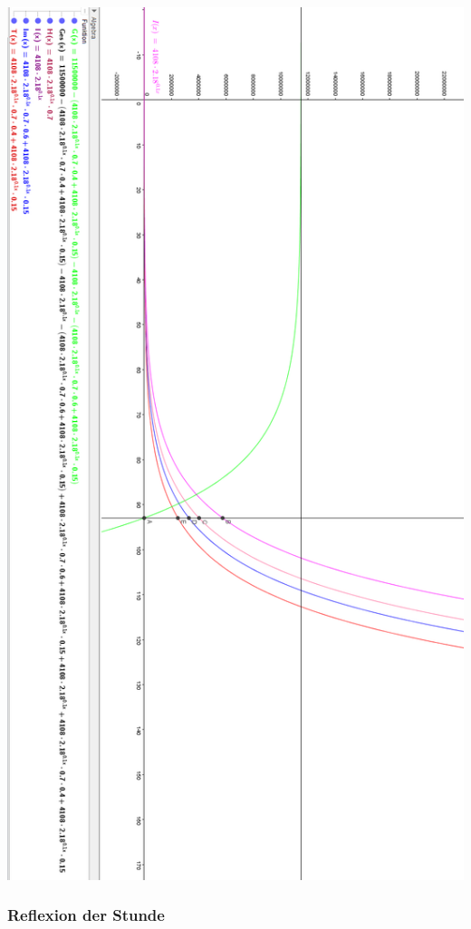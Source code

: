 \includegraphics[height=\textheight]{projekt/leistung_2_3}
\subsubsection{Reflexion der Stunde}
\newpage
